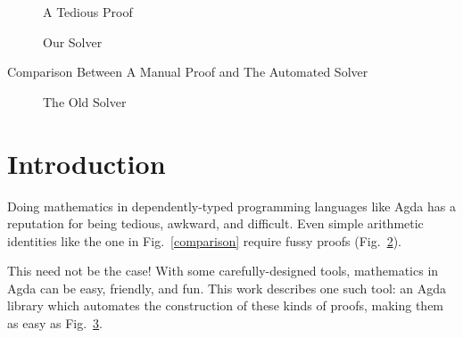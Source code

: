 \documentclass[acmsmall,review,anonymous]{acmart}\settopmatter{printfolios=true,printccs=false,printacmref=false}
\begin{document}
\begin{teaserfigure}
  \centering
  \begin{subfigure}[b]{\textwidth}
    \centering
    \label{ring-lemma}
  \end{subfigure}
  \begin{subfigure}[b]{.5\textwidth}
    \caption{A Tedious Proof}
    \label{ring-proof}
  \end{subfigure}%
  \begin{subfigure}[b]{.3\textwidth}
    \centering
    \caption{Our Solver}
    \label{the-solver}
  \end{subfigure}
  \caption{Comparison Between A Manual Proof and The Automated Solver}
  \label{comparison}
\end{teaserfigure}

\maketitle

\begin{figure}
  \caption{The Old Solver}
  \label{old-solver}
\end{figure}
\section{Introduction}
Doing mathematics in dependently-typed programming languages like Agda has a
reputation for being tedious, awkward, and difficult. Even simple arithmetic
identities like the one in Fig.~\ref{comparison} require fussy proofs
(Fig.~\ref{ring-proof}).

This need not be the case! With some carefully-designed tools, mathematics in
Agda can be easy, friendly, and fun. This work describes one such tool: an
Agda library which automates the construction of these kinds of proofs, making
them as easy as Fig.~\ref{the-solver}.
\end{document}
